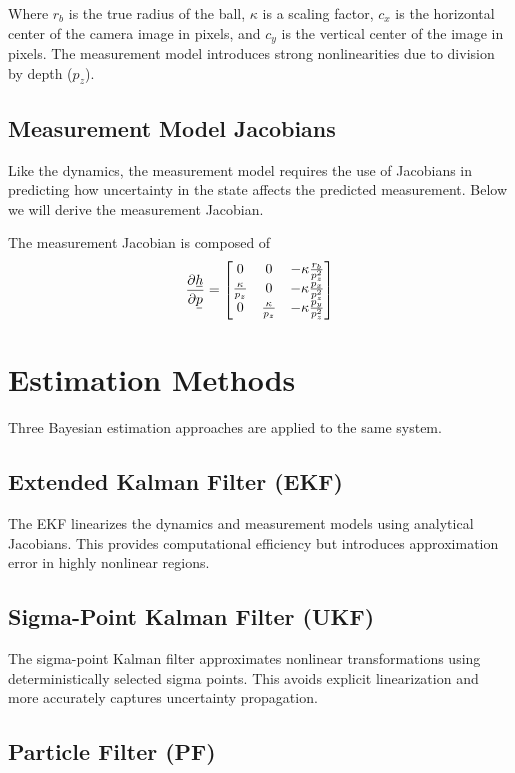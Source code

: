 \documentclass[11pt, letterpaper, twocolumn]{article}
\newcommand{\ul}[1] %
    {{}\mkern1mu\underline{\mkern-1mu#1\mkern-1mu}\mkern1mu}
\begin{document}
Where $r_b$ is the true radius of the ball, $\kappa$ is a scaling factor, $c_x$ 
is the horizontal center of the camera image in pixels, and $c_y$ is the vertical 
center of the image in pixels. The measurement model introduces strong nonlinearities 
due to division by depth ($p_z$).

\subsection*{Measurement Model Jacobians}
Like the dynamics, the measurement model requires the use of Jacobians in
predicting how uncertainty in the state affects the predicted measurement.
Below we will derive the measurement Jacobian.

The measurement Jacobian is composed of
\[
\frac{\partial\ul{h}}{\partial\ul{p}} = \begin{bmatrix}
    0 & 0 & -\kappa\frac{r_b}{p_z^2} \\
    \frac{\kappa}{p_z} & 0 & -\kappa\frac{p_x}{p_z^2} \\
    0 & \frac{\kappa}{p_z} & -\kappa\frac{p_y}{p_z^2}
\end{bmatrix}
\]

\section*{Estimation Methods}

Three Bayesian estimation approaches are applied to the same system.

\subsection*{Extended Kalman Filter (EKF)}

The EKF linearizes the dynamics and measurement models using analytical Jacobians. This
provides computational efficiency but introduces approximation error in highly nonlinear regions.

\subsection*{Sigma-Point Kalman Filter (UKF)}

The sigma-point Kalman filter approximates nonlinear transformations using deterministically
selected sigma points. This avoids explicit linearization and more accurately captures uncertainty propagation.

\subsection*{Particle Filter (PF)}
\end{document}
